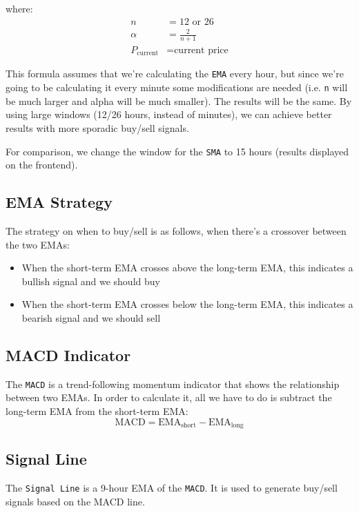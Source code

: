 \documentclass{article}
\begin{document}
where:
\begin{align*}
n &= 12 \text{ or } 26 \\
\alpha &= \frac{2}{n + 1} \\
P_{\text{current}} &= \text{current price}
\end{align*}

This formula assumes that we're calculating the \texttt{EMA} every hour, but since we're going to be calculating it
every minute some modifications are needed (i.e. \texttt{n} will be much larger and alpha will be much smaller).
The results will be the same. By using large windows (12/26 hours, instead of minutes), we can achieve better results
with more sporadic buy/sell signals.


For comparison, we change the window for the \texttt{SMA} to 15 hours (results displayed on the frontend).

\subsection{EMA Strategy}
The strategy on when to buy/sell is as follows, when there's a crossover between the two EMAs:
\begin{itemize}
    \item When the short-term EMA crosses above the long-term EMA, this indicates a bullish signal and we should buy
    \item When the short-term EMA crosses below the long-term EMA, this indicates a bearish signal and we should sell
\end{itemize}

\subsection{MACD Indicator}
The \texttt{MACD} is a trend-following momentum indicator that shows the relationship between two EMAs.
In order to calculate it, all we have to do is subtract the long-term EMA from the short-term EMA:
\begin{equation*}
\text{MACD} = \text{EMA}_{\text{short}} - \text{EMA}_{\text{long}}
\end{equation*}

\subsection{Signal Line}
The \texttt{Signal Line} is a 9-hour EMA of the \texttt{MACD}. It is used to generate buy/sell signals based on the MACD line.
\end{document}
